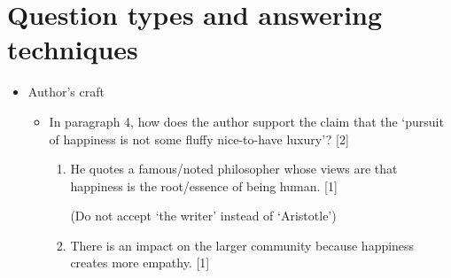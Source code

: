 \documentclass[oneside]{book}
\begin{document}
\section{Question types and answering techniques}
\begin{itemize}
    \item Author's craft
    \begin{itemize}
        \item In paragraph 4, how does the author support the claim that the `pursuit of
        happiness is not some fluffy nice-to-have luxury'? [2]
        \begin{enumerate}[label=(\alph*)]
            \item He quotes a famous/noted philosopher
            whose views are that happiness is the root/essence of being human. [1]
    
            (Do not accept `the writer' instead of `Aristotle')
            \item There is an impact on the larger community because happiness creates more empathy. [1]
    

\end{enumerate}
\end{itemize}
\end{itemize}
\end{document}
